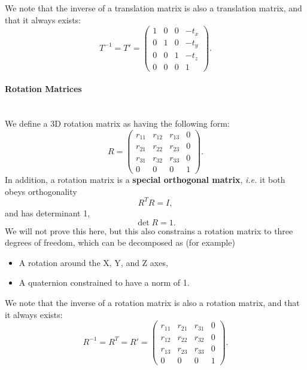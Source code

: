 \documentclass{article}
\begin{document}
We note that the inverse of a translation matrix is also a translation matrix, and that it always exists:
\begin{equation}
T^{-1} = T' = \begin{pmatrix}
1 & 0 & 0 & -t_x\\
0 & 1 & 0 & -t_y\\
0 & 0 & 1 & -t_z\\
0 & 0 & 0 & 1
\end{pmatrix}.
\end{equation}
\paragraph{Rotation Matrices}\mbox{}\\
We define a 3D rotation matrix as having the following form:
\begin{equation}
R = \begin{pmatrix}
r_{11} & r_{12} & r_{13} & 0\\
r_{21} & r_{22} & r_{23} & 0\\
r_{31} & r_{32} & r_{33} & 0\\
0 & 0 & 0 & 1
\end{pmatrix}.
\end{equation}
In addition, a rotation matrix is a \textbf{special orthogonal matrix}, \textit{i.e.} it both obeys orthogonality
\begin{equation}
R^T R = I,
\end{equation}
and has determinant 1,
\begin{equation}
\det R = 1.
\end{equation}
We will not prove this here, but this also constrains a rotation matrix to three degrees of freedom, which can be decomposed as (for example)
\begin{itemize}
\item A rotation around the X, Y, and Z axes,
\item A quaternion constrained to have a norm of 1.
\end{itemize}
We note that the inverse of a rotation matrix is also a rotation matrix, and that it always exists:
\begin{equation}
R^{-1} = R^T = R' =  \begin{pmatrix}
r_{11} & r_{21} & r_{31} & 0\\
r_{12} & r_{22} & r_{32} & 0\\
r_{13} & r_{23} & r_{33} & 0\\
0 & 0 & 0 & 1
\end{pmatrix}.
\end{equation}
\end{document}
